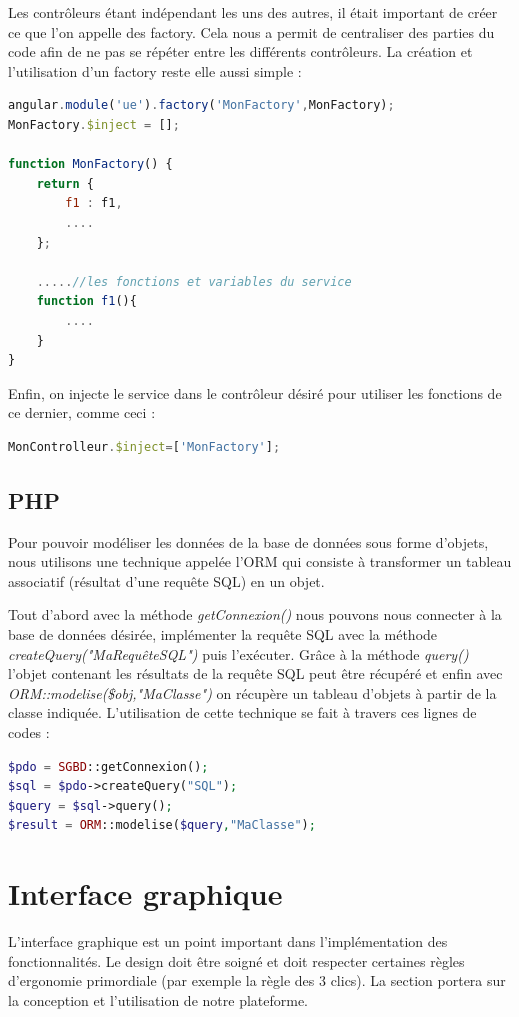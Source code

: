 \documentclass[12pt,a4paper,openany]{memoir}
\begin{document}
\par 
Les contrôleurs étant indépendant les uns des autres, il était important de créer ce que l'on appelle des factory. Cela nous a permit de centraliser des parties du code afin de ne pas se répéter entre les différents contrôleurs. La création et l'utilisation d'un factory reste elle aussi simple :
\begin{lstlisting}[language=JavaScript]
angular.module('ue').factory('MonFactory',MonFactory);
MonFactory.$inject = [];

function MonFactory() {
    return {
        f1 : f1,
        ....
    };

    .....//les fonctions et variables du service 
    function f1(){
        ....
    }
}
\end{lstlisting}
\par 
Enfin, on injecte le service dans le contrôleur désiré pour utiliser les fonctions de ce dernier, comme ceci :
\begin{lstlisting}[language=JavaScript]
MonControlleur.$inject=['MonFactory'];
\end{lstlisting}

\subsection{PHP}
\par
Pour pouvoir modéliser les données de la base de données sous forme d'objets, nous utilisons une technique appelée l'ORM qui consiste à transformer un tableau associatif (résultat d'une requête SQL) en un objet.
\par
Tout d'abord avec la méthode \textit{getConnexion()} nous pouvons nous connecter à la base de données désirée, implémenter la requête SQL avec la méthode \textit{createQuery("MaRequêteSQL")} puis l'exécuter. Grâce à la méthode \textit{query()} l'objet contenant les résultats de la requête SQL peut être récupéré et enfin avec \textit{ORM::modelise(\$obj,"MaClasse")} on récupère un tableau d'objets à partir de la classe indiquée.
L'utilisation de cette technique se fait à travers ces lignes de codes :
\begin{lstlisting}[language=PHP]
$pdo = SGBD::getConnexion();
$sql = $pdo->createQuery("SQL");
$query = $sql->query();
$result = ORM::modelise($query,"MaClasse");
\end{lstlisting}

\section{Interface graphique}
\par
L'interface graphique est un point important dans l'implémentation des fonctionnalités. Le design doit être soigné et doit respecter certaines règles d'ergonomie primordiale (par exemple la règle des 3 clics). La section portera sur la conception et l'utilisation de notre plateforme.
\par
\end{document}
